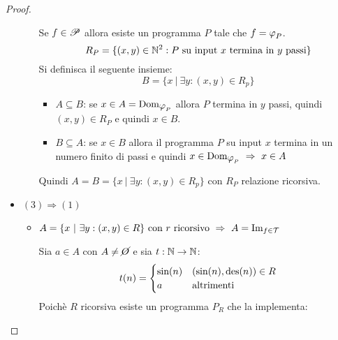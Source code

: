 \begin{proof}
\begin{itemize}
\begin{itemize}
            Se $f\in\mathscr{P}$ allora esiste un programma $P$ tale che $f=\semRAM_P$.
            $$ R_P = \{(x,y)\in\mathbb{N}^2:\text{$P$ su input $x$ termina in $y$ passi}\} $$
            Si definisca il seguente insieme:
            $$ B=\{ x\ |\ \exists y:(x,y)\in R_p \} $$
            \begin{itemize}
                \item[\textminus] $A\subseteq B$:
                    se $x\in A=\text{Dom}_{\semRAM_P}$ allora $P$ termina in $y$ passi,
                    quindi $(x,y)\in R_P$ e quindi $x\in B$.
                \item[\textminus] $B\subseteq A$: se $x\in B$ allora il programma $P$
                    su input $x$ termina in un numero finito di passi e quindi
                    $ x\in\text{Dom}_{\semRAM_P} \ \Rightarrow \ x\in A$
            \end{itemize}
            Quindi $A=B=\{ x\ |\ \exists y:(x,y)\in R_p \}$ con $R_P$ relazione ricorsiva.
        \end{itemize}
        \item $(3)\Rightarrow(1)$
            \begin{itemize}
                \item[] $A=\{ x\ |\ \exists y:(x,y)\in R\}\text{ con $r$ ricorsivo}
                \ \Rightarrow \ A=\text{Im}_{f\in\mathcal{T}}$

                Sia $a\in A$ con $A\neq\cancel{O}$ e sia $t:\mathbb{N}\to\mathbb{N}$:
                $$ t(n) = \begin{cases}
                    \text{sin}(n) & (\text{sin}(n),\text{des}(n))\in R\\
                    a & \text{altrimenti}
                \end{cases} $$
                Poichè $R$ ricorsiva esiste un programma $P_R$ che la implementa:


\end{itemize}
\end{itemize}
\end{proof}
